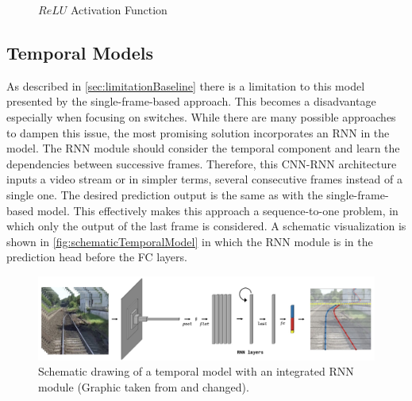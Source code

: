 \begin{figure}[H]
    \centering
    \caption{$ReLU$ Activation Function \cite{pytorch_relu_docu}}
    \label{fig:ReLU}
\end{figure}

\subsection{Temporal Models}
\label{sec:temporalModels}

As described in \autoref{sec:limitationBaseline} there is a limitation to this model presented by the single-frame-based approach.
This becomes a disadvantage especially when focusing on switches.
While there are many possible approaches to dampen this issue, the most promising solution incorporates an \ac{RNN} in the model.
The \ac{RNN} module should consider the temporal component and learn the dependencies between successive frames.
Therefore, this \ac{CNN}-\ac{RNN} architecture inputs a video stream or in simpler terms, several consecutive frames instead of a single one.
The desired prediction output is the same as with the single-frame-based model.
This effectively makes this approach a sequence-to-one problem, in which only the output of the last frame is considered.
A schematic visualization is shown in \autoref{fig:schematicTemporalModel} in which the \ac{RNN} module is in the prediction head before the \ac{FC} layers.

\begin{figure}[H]
    \centering
    \includegraphics[width=\linewidth]{PICs//temporalModels/schematicDrawing.jpg}
    \caption{Schematic drawing of a temporal model with an integrated \ac{RNN} module (Graphic taken from \cite{tepNet2024} and changed).}
    \label{fig:schematicTemporalModel}
\end{figure}

